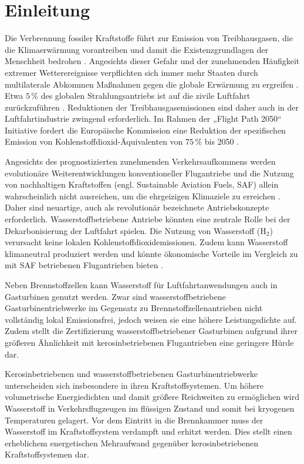 \chapter{Einleitung}\label{chap:einleitung}


Die Verbrennung fossiler Kraftstoffe führt zur Emission von Treibhausgasen, die die Klimaerwärmung vorantreiben und damit die Existenzgrundlagen der Menschheit bedrohen \cite{UN_ClimateChange}. Angesichts dieser Gefahr und der zunehmenden Häufigkeit extremer Wetterereignisse verpflichten sich immer mehr Staaten durch multilaterale Abkommen Maßnahmen gegen die globale Erwärmung zu ergreifen \cite{paris}. Etwa $5\,\%$ des globalen Strahlungsantriebs ist auf die zivile Luftfahrt zurückzuführen \cite{Grobler2024}. Reduktionen der Treibhausgasemissionen sind daher auch in der Luftfahrtindustrie zwingend erforderlich. Im Rahmen der „Flight Path 2050“ Initiative fordert die Europäische Kommission eine Reduktion der spezifischen Emission von Kohlenstoffdioxid-Äquivalenten von $75\,\%$ bis 2050 \cite{EuropeanCommission2011}.

Angesichts des prognostizierten zunehmenden Verkehrsaufkommens werden evolutionäre Weiterentwicklungen konventioneller Flugantriebe und die Nutzung von nachhaltigen Kraftstoffen (engl. Sustainable Aviation Fuels, SAF) allein wahrscheinlich nicht ausreichen, um die ehrgeizigen Klimaziele zu erreichen \cite{cleanskies}. Daher sind neuartige, auch als revolutionär bezeichnete Antriebskonzepte erforderlich. Wasserstoffbetriebene Antriebe könnten eine zentrale Rolle bei der Dekarbonisierung der Luftfahrt spielen. Die Nutzung von Wasserstoff (H$_2$) verursacht keine lokalen Kohlenstoffdioxidemissionen. Zudem kann Wasserstoff klimaneutral produziert werden und könnte  ökonomische Vorteile im Vergleich zu mit SAF betriebenen Flugantrieben bieten \cite{VanLandingham}.

Neben Brennstoffzellen kann Wasserstoff für Luftfahrtanwendungen auch in Gasturbinen genutzt werden. Zwar sind wasserstoffbetriebene Gasturbinentriebwerke im Gegensatz zu Brennstoffzellenantrieben nicht vollständig lokal Emissionsfrei, jedoch weisen sie eine höhere Leistungsdichte auf. Zudem stellt die Zertifizierung wasserstoffbetriebener Gasturbinen aufgrund ihrer größeren Ähnlichkeit mit kerosinbetriebenen Flugantrieben eine geringere Hürde dar. \cite{Kadyk.2018}

Kerosinbetriebenen und wasserstoffbetriebenen Gasturbinentriebwerke unterscheiden sich insbesondere in ihren Kraftstoffsystemen. Um höhere volumetrische Energiedichten und damit größere Reichweiten zu ermöglichen wird Wasserstoff in Verkehrsflugzeugen im flüssigen Zustand und somit bei kryogenen Temperaturen gelagert. Vor dem Eintritt in die Brennkammer muss der Wasserstoff im Kraftstoffsystem verdampft und erhitzt werden. Dies stellt einen erheblichem energetischen Mehraufwand gegenüber kerosinbetriebenen Kraftstoffsystemen dar. 

